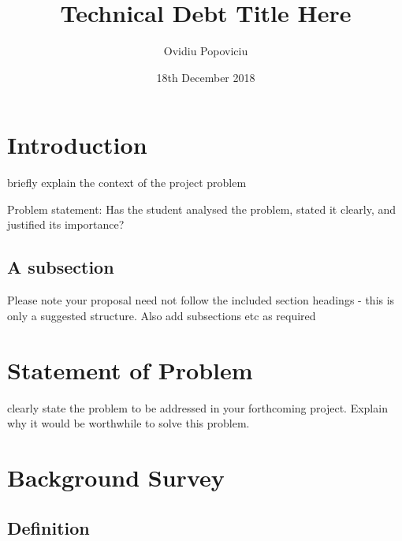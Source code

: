 \documentclass{mprop}
\begin{document}
\title{Technical Debt Title Here}
\author{Ovidiu Popoviciu}
\date{18th December 2018}
\maketitle

\tableofcontents
\newpage

\section{Introduction}\label{intro}

briefly explain the context of the project problem

Problem statement: Has the student analysed the problem, stated it clearly, and justified its importance?

\subsection{A subsection}
Please note your proposal need not follow the included section headings - this is only a suggested structure. Also add subsections etc as required

\section{Statement of Problem}

clearly state the problem to be addressed in your forthcoming project. Explain why it would be worthwhile to solve this problem.

\section{Background Survey}
\subsection{Definition}
\end{document}
